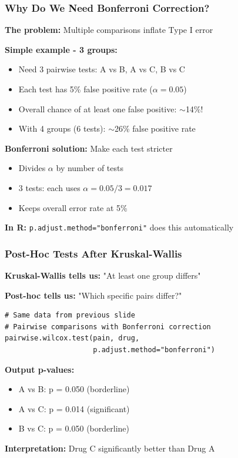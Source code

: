 \documentclass{beamer}
\begin{document}
\begin{frame}
\frametitle{Why Do We Need Bonferroni Correction?}
\textbf{The problem:} Multiple comparisons inflate Type I error

\vspace{0.3cm}
\textbf{Simple example - 3 groups:}
\begin{itemize}
\item Need 3 pairwise tests: A vs B, A vs C, B vs C
\item Each test has 5\% false positive rate ($\alpha = 0.05$)
\item Overall chance of at least one false positive: $\sim$14\%!
\item With 4 groups (6 tests): $\sim$26\% false positive rate
\end{itemize}

\vspace{0.3cm}
\textbf{Bonferroni solution:} Make each test stricter
\begin{itemize}
\item Divides $\alpha$ by number of tests
\item 3 tests: each uses $\alpha = 0.05/3 = 0.017$
\item Keeps overall error rate at 5\%
\end{itemize}

\vspace{0.3cm}
\textbf{In R:} \texttt{p.adjust.method="bonferroni"} does this automatically
\end{frame}

\begin{frame}[fragile]
\frametitle{Post-Hoc Tests After Kruskal-Wallis}
\textbf{Kruskal-Wallis tells us:} "At least one group differs"

\textbf{Post-hoc tells us:} "Which specific pairs differ?"

\vspace{0.2cm}
\begin{footnotesize}
\begin{verbatim}
# Same data from previous slide
# Pairwise comparisons with Bonferroni correction
pairwise.wilcox.test(pain, drug,
                     p.adjust.method="bonferroni")
\end{verbatim}
\end{footnotesize}

\textbf{Output p-values:}
\begin{itemize}\setlength\itemsep{-0.1em}
\item A vs B: p = 0.050 (borderline)
\item A vs C: p = 0.014 (significant)
\item B vs C: p = 0.050 (borderline)
\end{itemize}

\textbf{Interpretation:} Drug C significantly better than Drug A
\end{frame}
\end{document}
